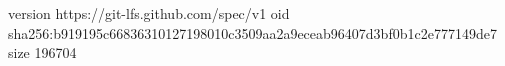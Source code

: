 version https://git-lfs.github.com/spec/v1
oid sha256:b919195c66836310127198010c3509aa2a9eceab96407d3bf0b1c2e777149de7
size 196704
